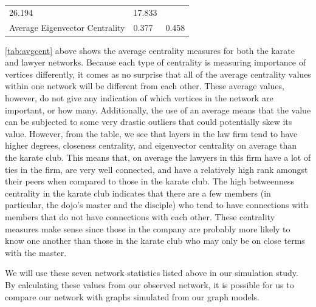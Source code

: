 \documentclass[12pt,twoside]{amherstthesis}
\begin{document}
\begin{longtable}[]{@{}lll@{}}
\begin{minipage}[t]{0.28\columnwidth}
  26.194\strut
  \end{minipage} & \begin{minipage}[t]{0.28\columnwidth}\raggedright\strut
  17.833\strut
  \end{minipage}\tabularnewline
  \begin{minipage}[t]{0.36\columnwidth}\raggedright\strut
  Average Eigenvector Centrality\strut
  \end{minipage} & \begin{minipage}[t]{0.28\columnwidth}\raggedright\strut
  0.377\strut
  \end{minipage} & \begin{minipage}[t]{0.28\columnwidth}\raggedright\strut
  0.458\strut
  \end{minipage}\tabularnewline
  \bottomrule
  \end{longtable}
  
  \autoref{tab:avgcent} above shows the average centrality measures for
  both the karate and lawyer networks. Because each type of centrality is
  measuring importance of vertices differently, it comes as no surprise
  that all of the average centrality values within one network will be
  different from each other. These average values, however, do not give
  any indication of which vertices in the network are important, or how
  many. Additionally, the use of an average means that the value can be
  subjected to some very drastic outliers that could potentially skew its
  value. However, from the table, we see that layers in the law firm tend
  to have higher degrees, closeness centrality, and eigenvector centrality
  on average than the karate club. This means that, on average the lawyers
  in this firm have a lot of ties in the firm, are very well connected,
  and have a relatively high rank amongst their peers when compared to
  those in the karate club. The high betweenness centrality in the karate
  club indicates that there are a few members (in particular, the dojo's
  master and the disciple) who tend to have connections with members that
  do not have connections with each other. These centrality measures make
  sense since those in the company are probably more likely to know one
  another than those in the karate club who may only be on close terms
  with the master.
  
  We will use these seven network statistics listed above in our
  simulation study. By calculating these values from our observed network,
  it is possible for us to compare our network with graphs simulated from
  our graph models.
  
\end{document}
